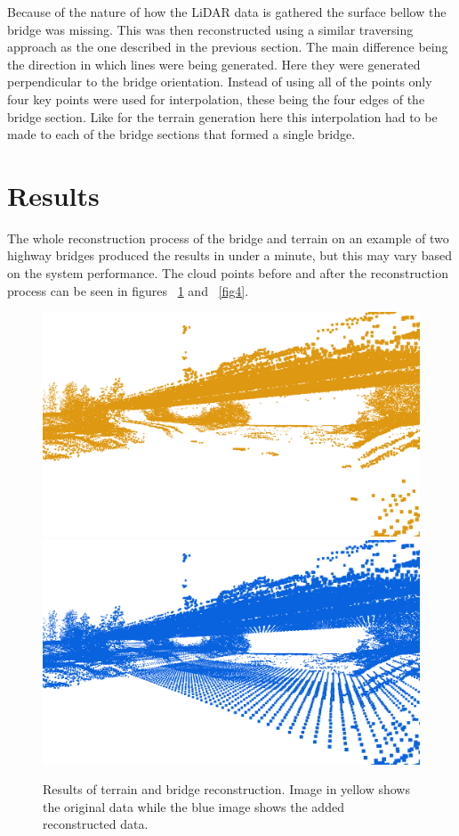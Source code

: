 \documentclass{egpubl-eurovis-star}
\begin{document}
Because of the nature of how the LiDAR data is gathered the surface bellow the bridge was missing.
This was then reconstructed using a similar traversing approach as the one described in the previous section. 
The main difference being the direction in which lines were being generated.
Here they were generated perpendicular to the bridge orientation.
Instead of using all of the points only four key points were used for interpolation, these being the four edges of the bridge section.
Like for the terrain generation here this interpolation had to be made to each of the bridge sections that formed a single bridge.

\section{Results}

The whole reconstruction process of the bridge and terrain on an example of two highway bridges produced the results in under a minute, but this may vary based on the system performance.
The cloud points before and after the reconstruction process can be seen in figures ~\ref{fig3} and ~\ref{fig4}.

\begin{figure}[ht]
    \centering
    \includegraphics[width=1\columnwidth]{side_pre_3.png}
    \includegraphics[width=1\columnwidth]{side_br_3.png}
    \caption{Results of terrain and bridge reconstruction. Image in yellow shows the original data while the blue image shows the added reconstructed data.}
    \label{fig3}
\end{figure}
\end{document}
